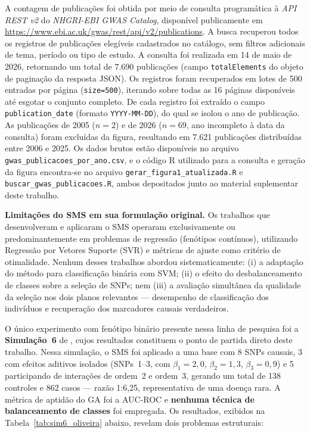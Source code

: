 \documentclass[
    12pt,
    a4paper,
    oneside,
    english,
    french,
    spanish,
    brazil
    ]{abntex2}
\newcommand{\novo}[1]{\textcolor{corNova}{#1}}
\begin{document}
\novo{A contagem de publicações foi obtida por meio de consulta programática à
\textit{API REST v2} do \textit{NHGRI-EBI GWAS Catalog}, disponível publicamente
em \url{https://www.ebi.ac.uk/gwas/rest/api/v2/publications}. A busca recuperou
todos os registros de publicações elegíveis cadastrados no catálogo, sem filtros
adicionais de tema, período ou tipo de estudo. A consulta foi realizada em
14 de maio de 2026, retornando um total de 7.690 publicações (campo
\texttt{totalElements} do objeto de paginação da resposta JSON). Os registros
foram recuperados em lotes de 500 entradas por página (\texttt{size=500}), iterando
sobre todas as 16 páginas disponíveis até esgotar o conjunto completo. De cada
registro foi extraído o campo \texttt{publication\_date} (formato
\texttt{YYYY-MM-DD}), do qual se isolou o ano de publicação. As publicações de
2005 ($n = 2$) e de 2026 ($n = 69$, ano incompleto à data da consulta) foram
excluídas da figura, resultando em 7.621 publicações distribuídas entre 2006 e
2025. Os dados brutos estão disponíveis no arquivo
\texttt{gwas\_publicacoes\_por\_ano.csv}, e o código R utilizado para a consulta
e geração da figura encontra-se no arquivo
\texttt{gerar\_figura1\_atualizada.R} e \texttt{buscar\_gwas\_publicacoes.R},
ambos depositados junto ao material suplementar deste trabalho.}



\textbf{Limitações do SMS em sua formulação original.} Os trabalhos que desenvolveram e aplicaram o SMS \cite{de2014snps,Oliveira2015,Souza2022,Baptista2024} operaram exclusivamente ou predominantemente em problemas de regressão (fenótipos contínuos), utilizando Regressão por Vetores Suporte (SVR) e métricas de ajuste como critério de otimalidade. Nenhum desses trabalhos abordou sistematicamente: (i) a adaptação do método para classificação binária com SVM; (ii) o efeito do desbalanceamento de classes sobre a seleção de SNPs; nem (iii) a avaliação simultânea da qualidade da seleção nos dois planos relevantes --- desempenho de classificação dos indivíduos e recuperação dos marcadores causais verdadeiros.

\novo{O único experimento com fenótipo binário presente nessa linha de pesquisa foi a \textbf{Simulação~6} de \citeonline{Oliveira2015}, cujos resultados constituem o ponto de partida direto deste trabalho. Nessa simulação, o SMS foi aplicado a uma base com 8 SNPs causais, 3 com efeitos aditivos isolados (SNPs~1--3, com $\beta_1=2{,}0$, $\beta_2=1{,}3$, $\beta_3=0{,}9$) e 5 participando de interações de ordem~2 e ordem~3, gerando um total de 138 controles e 862 casos --- razão 1:6,25, representativa de uma doença rara. A métrica de aptidão do GA foi a AUC-ROC e \textbf{nenhuma técnica de balanceamento de classes} foi empregada. Os resultados, exibidos na Tabela~\ref{tab:sim6_oliveira} abaixo, revelam dois problemas estruturais:}
\end{document}
